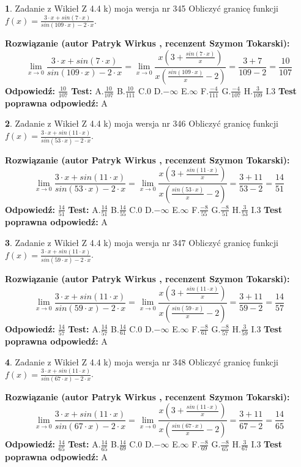 \documentclass[12pt, a4paper]{article}
\theoremstyle{definition} %
\newtheorem{zad}{}
\newcommand{\zadStart}[1]{\begin{zad}#1\newline}
\newcommand{\zadStop}{\end{zad}}
\newcommand{\rozwStart}[2]{\noindent \textbf{Rozwiązanie (autor #1 , recenzent #2): }\newline}
\newcommand{\rozwStop}{\newline}
\newcommand{\odpStart}{\noindent \textbf{Odpowiedź:}\newline}
\newcommand{\odpStop}{\newline}
\newcommand{\testStart}{\noindent \textbf{Test:}\newline}
\newcommand{\testStop}{\newline}
\newcommand{\kluczStart}{\noindent \textbf{Test poprawna odpowiedź:}\newline}
\newcommand{\kluczStop}{\newline}
\begin{document}
\zadStart{Zadanie z Wikieł Z 4.4 k) moja wersja nr 345}
Obliczyć granicę funkcji $f(x)=\frac{3\cdot x +sin(7\cdot x)}{sin(109\cdot x) -2\cdot x}$.
\zadStop
\rozwStart{Patryk Wirkus}{Szymon Tokarski}
$$\lim\limits_{x\to 0}\frac{3\cdot x +sin(7\cdot x)}{sin(109\cdot x) -2\cdot x}
=\lim\limits_{x\to 0}\frac{x(3+\frac{sin(7\cdot x)}{x})}{x(\frac{sin(109\cdot x)}{x}-2)}
=\frac{3+7}{109-2} = \frac{10}{107}$$
\rozwStop
\odpStart
$\frac{10}{107}$
\odpStop
\testStart
A.$\frac{10}{107}$
B.$\frac{10}{111}$
C.$0$
D.$-\infty$
E.$\infty$
F.$\frac{-4}{111}$
G.$\frac{-4}{107}$
H.$\frac{3}{109}$
I.$3$
\testStop
\kluczStart
A
\kluczStop



\zadStart{Zadanie z Wikieł Z 4.4 k) moja wersja nr 346}
Obliczyć granicę funkcji $f(x)=\frac{3\cdot x +sin(11\cdot x)}{sin(53\cdot x) -2\cdot x}$.
\zadStop
\rozwStart{Patryk Wirkus}{Szymon Tokarski}
$$\lim\limits_{x\to 0}\frac{3\cdot x +sin(11\cdot x)}{sin(53\cdot x) -2\cdot x}
=\lim\limits_{x\to 0}\frac{x(3+\frac{sin(11\cdot x)}{x})}{x(\frac{sin(53\cdot x)}{x}-2)}
=\frac{3+11}{53-2} = \frac{14}{51}$$
\rozwStop
\odpStart
$\frac{14}{51}$
\odpStop
\testStart
A.$\frac{14}{51}$
B.$\frac{14}{55}$
C.$0$
D.$-\infty$
E.$\infty$
F.$\frac{-8}{55}$
G.$\frac{-8}{51}$
H.$\frac{3}{53}$
I.$3$
\testStop
\kluczStart
A
\kluczStop



\zadStart{Zadanie z Wikieł Z 4.4 k) moja wersja nr 347}
Obliczyć granicę funkcji $f(x)=\frac{3\cdot x +sin(11\cdot x)}{sin(59\cdot x) -2\cdot x}$.
\zadStop
\rozwStart{Patryk Wirkus}{Szymon Tokarski}
$$\lim\limits_{x\to 0}\frac{3\cdot x +sin(11\cdot x)}{sin(59\cdot x) -2\cdot x}
=\lim\limits_{x\to 0}\frac{x(3+\frac{sin(11\cdot x)}{x})}{x(\frac{sin(59\cdot x)}{x}-2)}
=\frac{3+11}{59-2} = \frac{14}{57}$$
\rozwStop
\odpStart
$\frac{14}{57}$
\odpStop
\testStart
A.$\frac{14}{57}$
B.$\frac{14}{61}$
C.$0$
D.$-\infty$
E.$\infty$
F.$\frac{-8}{61}$
G.$\frac{-8}{57}$
H.$\frac{3}{59}$
I.$3$
\testStop
\kluczStart
A
\kluczStop



\zadStart{Zadanie z Wikieł Z 4.4 k) moja wersja nr 348}
Obliczyć granicę funkcji $f(x)=\frac{3\cdot x +sin(11\cdot x)}{sin(67\cdot x) -2\cdot x}$.
\zadStop
\rozwStart{Patryk Wirkus}{Szymon Tokarski}
$$\lim\limits_{x\to 0}\frac{3\cdot x +sin(11\cdot x)}{sin(67\cdot x) -2\cdot x}
=\lim\limits_{x\to 0}\frac{x(3+\frac{sin(11\cdot x)}{x})}{x(\frac{sin(67\cdot x)}{x}-2)}
=\frac{3+11}{67-2} = \frac{14}{65}$$
\rozwStop
\odpStart
$\frac{14}{65}$
\odpStop
\testStart
A.$\frac{14}{65}$
B.$\frac{14}{69}$
C.$0$
D.$-\infty$
E.$\infty$
F.$\frac{-8}{69}$
G.$\frac{-8}{65}$
H.$\frac{3}{67}$
I.$3$
\testStop
\kluczStart
A
\kluczStop
\end{document}
